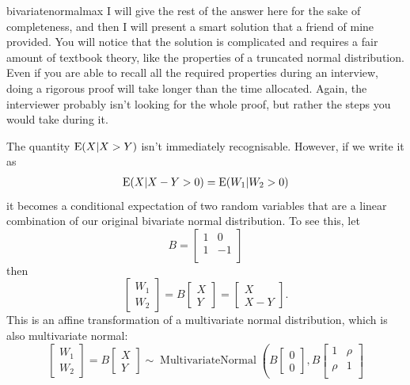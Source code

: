 \begin{answer}{bivariatenormalmax}
I will give the rest of the answer here for the sake of completeness, and then I will present a smart solution that a friend of mine provided.
You will notice that the solution is complicated and requires a fair amount of textbook theory, like the properties of a truncated normal distribution.
Even if you are able to recall all the required properties during an interview, doing a rigorous proof will take longer than the time allocated.
Again, the interviewer probably isn't looking for the whole proof, but rather the steps you would take during it.

The quantity $\operatorname{\mathrm{E}}(X|X > Y)$ isn't immediately recognisable.
However, if we write it as
\begin{align*}
\operatorname{\mathrm{E}}(X|X-Y > 0) = \operatorname{\mathrm{E}}(W_1|W_2 > 0)
\end{align*}
it becomes a conditional expectation of two random variables that are a linear combination of our original bivariate normal distribution.
To see this, let
\[B =
\begin{bmatrix}
  1   &  0 \\
  1   & -1 \\
  \end{bmatrix}
\]
then
\[
\begin{bmatrix}
  W_1 \\ W_2
\end{bmatrix}
=
B
  \begin{bmatrix}
  X \\ Y
  \end{bmatrix}
  =
  \begin{bmatrix}
  X \\ X-Y
  \end{bmatrix}
  \text{.}
\]
This is an affine transformation of a multivariate normal distribution, which is also multivariate normal:
\[
\begin{bmatrix}
  W_1 \\ W_2
\end{bmatrix}
=
B
\begin{bmatrix}
X \\ Y
\end{bmatrix}
\sim
\operatorname{MultivariateNormal}
\left(
B
\begin{bmatrix}
0 \\ 0
\end{bmatrix}
  ,
  B
  \begin{bmatrix}
  1      &   \rho \\
  \rho   &   1    \\
  \end{bmatrix}
\]
\end{answer}
